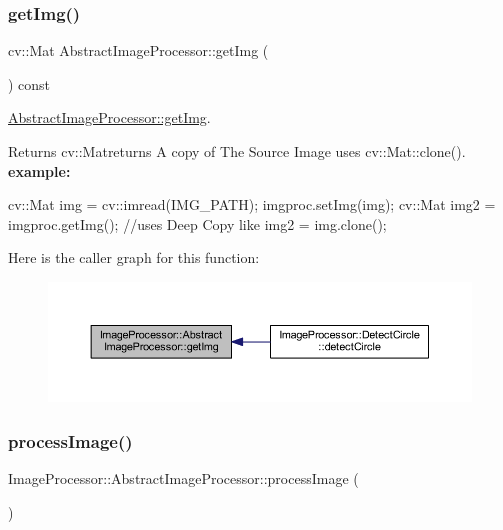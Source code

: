 \subsubsection{\texorpdfstring{get\+Img()}{getImg()}}
{\footnotesize\ttfamily cv\+::\+Mat Abstract\+Image\+Processor\+::get\+Img (\begin{DoxyParamCaption}{ }\end{DoxyParamCaption}) const}



\hyperlink{class_image_processor_1_1_abstract_image_processor_a904d1619b2c6be2c5382469325ca43e3}{Abstract\+Image\+Processor\+::get\+Img}. 

\begin{DoxyReturn}{Returns}
cv\+::\+Matreturns A copy of The Source Image uses cv\+::\+Mat\+::clone(). {\bfseries example\+:} 
\begin{DoxyCode}
cv::Mat img = cv::imread(IMG\_PATH);
imgproc.setImg(img);
cv::Mat img2 = imgproc.getImg(); \textcolor{comment}{//uses Deep Copy like img2 = img.clone();}
\end{DoxyCode}
 
\end{DoxyReturn}
Here is the caller graph for this function\+:\nopagebreak
\begin{figure}[H]
\begin{center}
\leavevmode
\includegraphics[width=350pt]{dc/d61/class_image_processor_1_1_abstract_image_processor_a904d1619b2c6be2c5382469325ca43e3_icgraph}
\end{center}
\end{figure}
\mbox{\label{class_image_processor_1_1_abstract_image_processor_ad033ae911918b0f6842b7b1d6cdd2b90}} 
\subsubsection{\texorpdfstring{process\+Image()}{processImage()}}
{\footnotesize\ttfamily Image\+Processor\+::\+Abstract\+Image\+Processor\+::process\+Image (\begin{DoxyParamCaption}{ }\end{DoxyParamCaption})\hspace{0.3cm}{\ttfamily [pure virtual]}}



